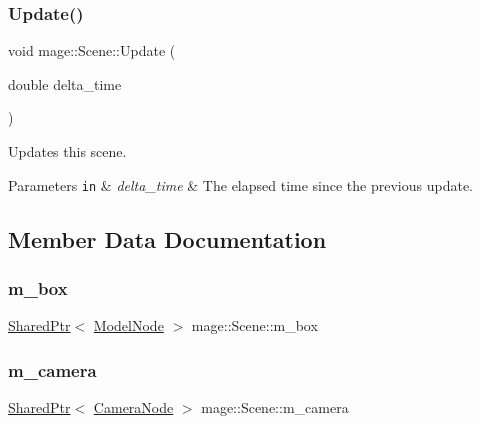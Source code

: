 \subsubsection{\texorpdfstring{Update()}{Update()}}
{\footnotesize\ttfamily void mage\+::\+Scene\+::\+Update (\begin{DoxyParamCaption}\item[{double}]{delta\+\_\+time }\end{DoxyParamCaption})}

Updates this scene.


\begin{DoxyParams}[1]{Parameters}
\mbox{\tt in}  & {\em delta\+\_\+time} & The elapsed time since the previous update. \\
\hline
\end{DoxyParams}


\subsection{Member Data Documentation}
\hypertarget{classmage_1_1_scene_ae60b598353c6c5b33947a6bb9e822a23}{}\label{classmage_1_1_scene_ae60b598353c6c5b33947a6bb9e822a23} 
\subsubsection{\texorpdfstring{m\+\_\+box}{m\_box}}
{\footnotesize\ttfamily \hyperlink{namespacemage_a1e01ae66713838a7a67d30e44c67703e}{Shared\+Ptr}$<$ \hyperlink{classmage_1_1_model_node}{Model\+Node} $>$ mage\+::\+Scene\+::m\+\_\+box\hspace{0.3cm}{\ttfamily [private]}}

\hypertarget{classmage_1_1_scene_a39c785951d9fb99477c1894eabba0cc6}{}\label{classmage_1_1_scene_a39c785951d9fb99477c1894eabba0cc6} 
\subsubsection{\texorpdfstring{m\+\_\+camera}{m\_camera}}
{\footnotesize\ttfamily \hyperlink{namespacemage_a1e01ae66713838a7a67d30e44c67703e}{Shared\+Ptr}$<$ \hyperlink{classmage_1_1_camera_node}{Camera\+Node} $>$ mage\+::\+Scene\+::m\+\_\+camera\hspace{0.3cm}{\ttfamily [private]}}

